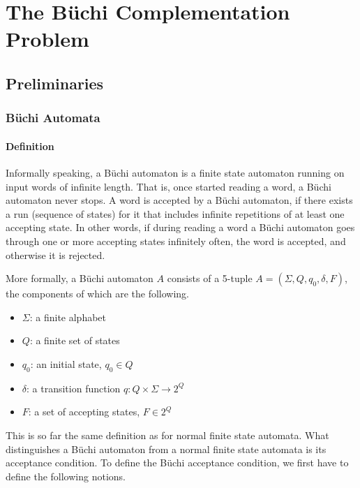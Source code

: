 \documentclass{scrreprt}
\begin{document}



\chapter{The Büchi Complementation Problem}
\section{Preliminaries}
\subsection{Büchi Automata}
\subsubsection{Definition}
Informally speaking, a Büchi automaton is a finite state automaton running on input words of infinite length. That is, once started reading a word, a Büchi automaton never stops. A word is accepted by a Büchi automaton, if there exists a run (sequence of states) for it that includes infinite repetitions of at least one accepting state. In other words, if during reading a word a Büchi automaton goes through one or more accepting states infinitely often, the word is accepted, and otherwise it is rejected.

More formally, a Büchi automaton $A$ consists of a 5-tuple $A = (\Sigma, Q, q_0, \delta, F)$, the components of which are the following.
\begin{itemize}
\item $\Sigma$: a finite alphabet
\item $Q$: a finite set of states
\item $q_0$: an initial state, $q_0 \in Q$
\item $\delta$: a transition function $q: Q \times \Sigma \rightarrow 2^Q$ %
\item $F$: a set of accepting states, $F \in 2^Q$
\end{itemize}

This is so far the same definition as for normal finite state automata. What distinguishes a Büchi automaton from a normal finite state automata is its acceptance condition. To define the Büchi acceptance condition, we first have to define the following notions.
\end{document}
